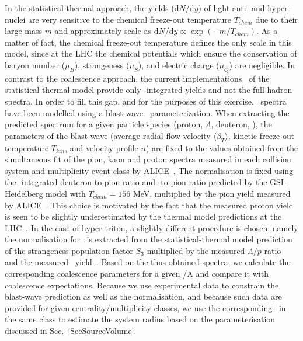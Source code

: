 \documentclass[a4paper,11pt]{scrartcl} %
\begin{document}
In the statistical-thermal approach, the yields (d$N$/d$y$) of light anti- and hyper-nuclei are very sensitive to the chemical freeze-out temperature $T_{chem}$ due to their large mass $m$ and approximately scale as d$N$/d$y \propto \exp(-m/T_{chem})$. As a matter of fact, the chemical freeze-out temperature defines the only scale in this model, since at the LHC the chemical potentials which ensure the conservation of baryon number ($\mu_{B}$), strangeness ($\mu_{S}$), and electric charge ($\mu_{Q}$) are negligible.
In contrast to the coalescence approach, the current implementations~\cite{Petran:2013dva,Wheaton:2004qb,Andronic:2005yp} of the statistical-thermal model provide only \pt-integrated yields and not the full hadron spectra. 
In order to fill this gap, and for the purposes of this exercise, \pt~spectra have been modelled using a blast-wave~\cite{Schnedermann:1993ws} parameterization. When extracting the predicted spectrum for a given particle species (proton, $\Lambda$, deuteron, \hethree), the parameters of the blast-wave (average radial flow velocity $\langle\beta_{T}\rangle$, kinetic freeze-out temperature $T_{kin}$, and velocity profile $n$) are fixed to the values obtained from the simultaneous fit of the pion, kaon and proton spectra measured in each collision system and multiplicity event class by ALICE~\cite{Abelev:2013vea}. 
The normalisation is fixed using the \pt-integrated deuteron-to-pion ratio and \hethree-to-pion ratio predicted by the GSI-Heidelberg model with $T_{chem} = 156$ MeV, multiplied by the pion yield measured by ALICE~\cite{Abelev:2013vea}. 
This choice is motivated by the fact that the measured proton yield is seen to be slightly underestimated by the thermal model predictions at the LHC~\cite{Abelev:2012wca}.
In the case of hyper-triton, a slightly different procedure is chosen, namely the normalisation for \hthreelambda~is extracted from the statistical-thermal model prediction of the strangeness population factor $S_{3}$ multiplied by the measured $\Lambda/p$ ratio~\cite{Abelev:2013xaa,Abelev:2013vea} and the measured \hethree~yield~\cite{ALICE:deuteronppPbPb2015}. Based on the thus obtained spectra, we calculate the corresponding coalescence parameters for a given \pt/A and compare it with coalescence expectations. Because we use experimental data to constrain the blast-wave prediction as well as the normalisation, and because such data are provided for given centrality/multiplicity classes, we use the corresponding \avdNdeta~in the same class to estimate the system radius based on the parameterisation discussed in Sec.~\ref{SecSourceVolume}. 
\end{document}
